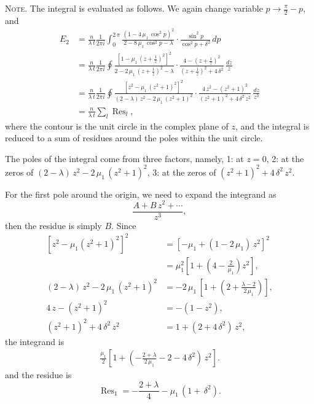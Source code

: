 \documentclass[reprint]{revtex4-1}
\newcommand{\note}[1]{{\color{DarkGreen}\footnotesize \textsc{Note.} #1}}
\newcommand{\Err}{E}
\begin{document}
\note{The integral is evaluated as follows.
%
We again change variable $p \to \frac{ \pi } { 2 } - p$,
and
$$
\begin{aligned}
\Err_2
&=
\frac{n}{\lambda \, t}
\frac{1}{2 \pi i}
\int_0^{2 \, \pi}
\frac{ \left(1 - 4 \, \mu_1 \, \cos^2 p \right)^2 }
     {       2 - 8 \, \mu_1 \, \cos^2 p - \lambda }
\cdot
\frac{ \sin^2 p            }
     { \cos^2 p + \delta^2 }
\, dp
\\
&=
\frac{n}{\lambda \, t}
\frac{1}{2 \pi i}
\oint
\frac{ \left[1 -      \mu_1 \, \left(z + \frac{1}{z}\right)^2 \right]^2 }
     {       2 - 2 \, \mu_1 \, \left(z + \frac{1}{z}\right)^2 - \lambda }
\cdot
\frac{ 4 - \left( z + \frac 1 z \right)^2 }
     { \left( z + \frac 1 z \right)^2 + 4 \, \delta^2 }
\, \frac{dz}{z}
\\
&=
\frac{n}{\lambda \, t}
\frac{1}{2 \pi i}
\oint
\frac{ \left[z^2 -      \mu_1 \, (z^2 + 1)^2 \right]^2   }
     {  (2 - \lambda) \, z^2 - 2 \, \mu_1 \, (z^2 + 1)^2 }
\cdot
\frac{ 4 \, z^2 - ( z^2 + 1 )^2 }
     { ( z^2 + 1 )^2 + 4 \, \delta^2 \, z^2 }
\, \frac{ dz }{ z^3 }
\\
&=
\frac{ n } { \lambda \, t }
\sum_l \operatorname{Res}_l
,
\end{aligned}
$$
where the contour is the unit circle
in the complex plane of $z$,
and the integral is reduced to a sum of residues
around the poles within the unit circle.

The poles of the integral come from three factors,
namely,
1: at $z = 0$,
2: at the zeros of
$(2 - \lambda) \, z^2 - 2 \, \mu_1 \, (z^2 + 1)^2$,
3: at the zeros of
$( z^2 + 1 )^2 + 4 \, \delta^2 \, z^2$.

For the first pole around the origin,
we need to expand the integrand as
$$
\frac{ A + B \, z^2 + \cdots }
     {          z^3          },
$$
then the residue is simply $B$.
%
Since
$$
\begin{aligned}
\left[ z^2 - \mu_1 (z^2 + 1)^2 \right]^2
&=
[ - \mu_1 + (1 - 2 \, \mu_1) \, z^2]^2
\\
&=
\mu_1^2
\left[
  1 + \left(4 - \tfrac { 2  } { \mu_1 } \right) z^2
\right],
\\
%
(2 - \lambda) \, z^2 - 2 \, \mu_1 \, (z^2 + 1)^2
&=
-2 \, \mu_1 \,
\left[
  1 + \left(
        2 + \tfrac{ \lambda - 2 } { 2 \, \mu_1 }
      \right)
\right],
\\
%
4 \, z - ( z^2 + 1 )^2
&=
-( 1 - z^2 ),
\\
%
( z^2 + 1 )^2 + 4 \, \delta^2 \, z^2
&=
1 + (2 + 4 \, \delta^2) \, z^2,
\end{aligned}
$$
the integrand is
$$
\begin{aligned}
\frac{ \mu_1 }
     {   2   }
\left[
  1 + \left(
        - \frac{ 2 + \lambda } { 2 \, \mu_1 }
        - 2 - 4 \, \delta^2
      \right) \, z^2
\right].
\end{aligned}
$$
and the residue is
$$
\operatorname{Res}_1
=
  - \frac{ 2 + \lambda } { 4 }
  - \mu_1 \, \left( 1 +  \, \delta^2 \right).
$$


}
\end{document}
